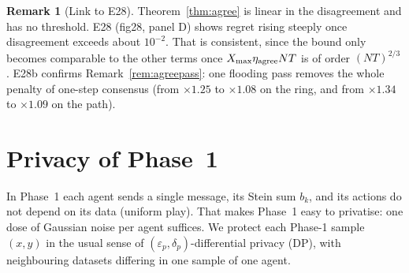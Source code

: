 \documentclass[11pt]{article}
\theoremstyle{definition}
\newtheorem{remark}{Remark}
\newcommand{\Xmax}{X_{\max}}
\begin{document}
\begin{remark}[Link to E28]
Theorem~\ref{thm:agree} is linear in the disagreement and has no threshold. E28 (fig28, panel D) shows regret rising
steeply once disagreement exceeds about $10^{-2}$. That is consistent, since the bound only becomes comparable to the
other terms once $\Xmax\eta_{\rm agree}NT$ is of order $(NT)^{2/3}$. E28b confirms Remark~\ref{rem:agreepass}: one flooding pass
removes the whole penalty of one-step consensus (from $\times1.25$ to $\times1.08$ on the ring, and from $\times1.34$ to
$\times1.09$ on the path).
\end{remark}

\section{Privacy of Phase~1}\label{sec:private}

In Phase~1 each agent sends a single message, its Stein sum $b_k$, and its actions do not depend on its data
(uniform play). That makes Phase~1 easy to privatise: one dose of Gaussian noise per agent suffices. We protect each
Phase-1 sample $(x,y)$ in the usual sense of $(\varepsilon_p,\delta_p)$-differential privacy (DP), with neighbouring
datasets differing in one sample of one agent.
\end{document}
